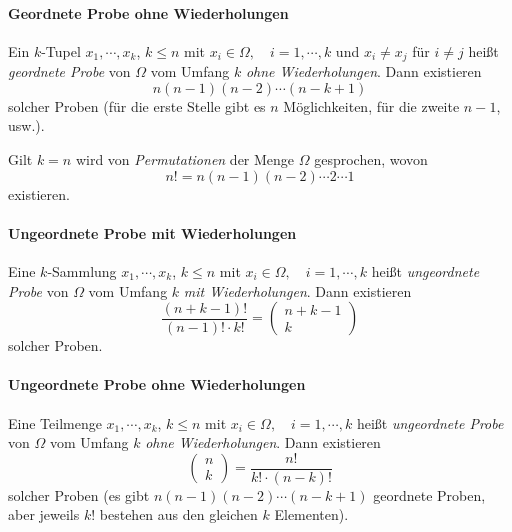 			\paragraph{Geordnete Probe ohne Wiederholungen}
				Ein \(k\)-Tupel \( x_1, \cdots, x_k \), \( k \leq n \) mit \( x_i \in \Omega, \quad i = 1, \cdots, k \) und \( x_i \neq x_j \) für \( i \neq j \) heißt \textit{geordnete Probe} von \(\Omega\) vom Umfang \(k\) \textit{ohne Wiederholungen}. Dann existieren
				\begin{equation*}
					n(n - 1)(n - 2) \cdots (n - k + 1)
				\end{equation*}
				solcher Proben (für die erste Stelle gibt es \(n\) Möglichkeiten, für die zweite \(n - 1\), usw.).

				Gilt \(k = n\) wird von \textit{Permutationen} der Menge \(\Omega\) gesprochen, wovon
				\begin{equation*}
					n! = n(n - 1)(n - 2) \cdots 2 \cdots 1
				\end{equation*}
				existieren.

			\paragraph{Ungeordnete Probe mit Wiederholungen}
				Eine \(k\)-Sammlung \( x_1, \cdots, x_k \), \( k \leq n \) mit \( x_i \in \Omega, \quad i = 1, \cdots, k \) heißt \textit{ungeordnete Probe} von \(\Omega\) vom Umfang \(k\) \textit{mit Wiederholungen}. Dann existieren
				\begin{equation*}
					\frac{(n + k - 1)!}{(n - 1)! \cdot k!} =
					\begin{pmatrix}
						n + k - 1 \\
						k
					\end{pmatrix}
				\end{equation*}
				solcher Proben.

			\paragraph{Ungeordnete Probe ohne Wiederholungen}
				Eine Teilmenge \( x_1, \cdots, x_k \), \( k \leq n \) mit \( x_i \in \Omega, \quad i = 1, \cdots, k \) heißt \textit{ungeordnete Probe} von \(\Omega\) vom Umfang \(k\) \textit{ohne Wiederholungen}. Dann existieren
				\begin{equation*}
					\begin{pmatrix}
						n \\
						k
					\end{pmatrix}
					=
					\frac{n!}{k! \cdot (n - k)!}
				\end{equation*}
				solcher Proben (es gibt \( n(n - 1)(n - 2) \cdots (n - k + 1) \) geordnete Proben, aber jeweils \(k!\) bestehen aus den gleichen \(k\) Elementen).

